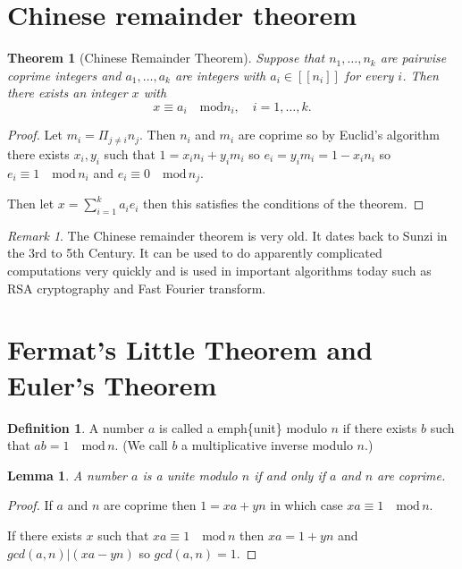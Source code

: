 \documentclass[
]{book}
\newtheorem{theorem}{Theorem}[chapter]
\newtheorem{lemma}{Lemma}[chapter]
\theoremstyle{definition}
\newtheorem{definition}{Definition}[chapter]
\theoremstyle{definition}
\theoremstyle{definition}
\theoremstyle{definition}
\theoremstyle{remark}
\newtheorem*{remark}{Remark}
\begin{document}
\section{Chinese remainder theorem}\label{chinese-remainder-theorem}

\begin{theorem}[Chinese Remainder Theorem]
Suppose that \(n_1, \dots, n_k\) are pairwise coprime integers and \(a_1, \dots, a_k\) are integers with \(a_i \in [[n_i]]\) for every \(i\). Then there exists an integer \(x\) with
\[ x \equiv a_i \quad \mbox{mod} n_i, \quad i = 1, \dots, k.  \]
\end{theorem}

\begin{proof}
Let \(m_i = \Pi_{j \neq i} n_j\). Then \(n_i\) and \(m_i\) are coprime so by Euclid's algorithm there exists \(x_i,y_i\) such that \(1 = x_i n_i + y_i m_i\) so \(e_i =y_i m_i = 1- x_i n_i\) so \(e_i \equiv 1 \quad \mbox{mod} \, n_i\) and \(e_i \equiv 0 \quad \mbox{mod} \, n_j\).

Then let \(x = \sum_{i=1}^k a_i e_i\) then this satisfies the conditions of the theorem.
\end{proof}

\begin{remark}
The Chinese remainder theorem is very old. It dates back to Sunzi in the 3rd to 5th Century. It can be used to do apparently complicated computations very quickly and is used in important algorithms today such as RSA cryptography and Fast Fourier transform.
\end{remark}

\section{Fermat's Little Theorem and Euler's Theorem}\label{fermats-little-theorem-and-eulers-theorem}

\begin{definition}
A number \(a\) is called a emph\{unit\} modulo \(n\) if there exists \(b\) such that \(ab = 1 \quad \mbox{mod} \, n\). (We call \(b\) a multiplicative inverse modulo \(n\).)
\end{definition}

\begin{lemma}
A number \(a\) is a unite modulo \(n\) if and only if \(a\) and \(n\) are coprime.
\end{lemma}

\begin{proof}
If \(a\) and \(n\) are coprime then \(1 = xa + yn\) in which case \(xa\equiv 1 \quad \mbox{mod} \, n\).

If there exists \(x\) such that \(xa \equiv 1 \quad \mbox{mod} \, n\) then \(x a = 1 + y n\) and \(gcd(a,n) | (xa-yn)\) so \(gcd(a,n) = 1\).
\end{proof}
\end{document}
